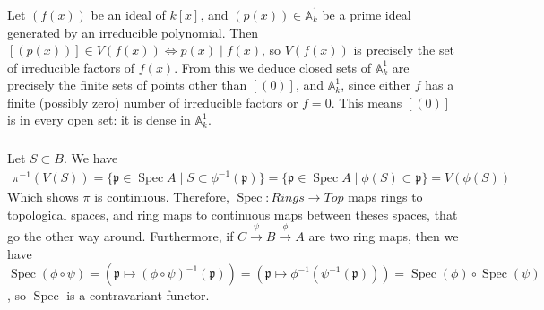 \documentclass{article}
\newcommand{\A}{\mathbb{A}}
\newcommand{\Top}{\mathit{Top}}
\newcommand{\Ring}{\mathit{Rings}}
\DeclareMathOperator{\Spec}{Spec}
\newcommand{\p}{\mathfrak{p}}
\newcommand{\exercise}{\subsubsection} %
\begin{document}
\exercise{} Let $(f(x))$ be an ideal of $k[x]$, and $(p(x)) \in \A_k^1$ be a prime ideal generated by an irreducible polynomial. Then $[(p(x))] \in V(f(x)) \iff p(x) \mid f(x)$, so $V(f(x))$ is precisely the set of irreducible factors of $f(x)$. From this we deduce closed sets of $\A_k^1$ are precisely the finite sets of points other than $[(0)]$, and $\A_k^1$, since either $f$ has a finite (possibly zero) number of irreducible factors or $f=0$. This means $[(0)]$ is in every open set: it is dense in $\A_k^1$.

\exercise{} \label{zariski_continu}Let $S \subset B$. We have
\begin{align*}
    \pi^{-1}(V(S)) = \{\p \in \Spec A \mid S \subset \phi^{-1}(\p)\} = \{\p \in \Spec A \mid \phi(S) \subset \p\} = V(\phi(S))
\end{align*}
Which shows $\pi$ is continuous. Therefore, $\Spec : \Ring \to \Top$ maps rings to topological spaces, and ring maps to continuous maps between theses spaces, that go the other way around. Furthermore, if $C \xrightarrow{\psi} B \xrightarrow{\phi} A$ are two ring maps, then we have $\Spec(\phi \circ \psi) = (\p \mapsto (\phi\circ \psi)^{-1} (\p)) = (\p \mapsto \phi^{-1}(\psi^{-1} (\p))) = \Spec(\phi) \circ \Spec (\psi)$, so $\Spec$ is a contravariant functor.
\end{document}
